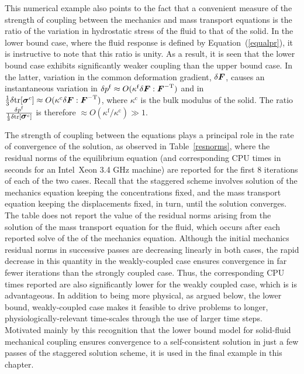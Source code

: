 This numerical example also points to the fact that a convenient
measure of the strength of coupling between the mechanics and mass
transport equations is the ratio of the variation in hydrostatic
stress of the fluid to that of the solid. In the lower bound case,
where the fluid response is defined by Equation~(\ref{equalpr}), it is
instructive to note that this ratio is unity. As a result, it is seen
that the lower bound case exhibits significantly weaker coupling than
the upper bound case. In the latter, variation in the common
deformation gradient, $\delta \mbox{\boldmath$ F$}$, causes an instantaneous variation
in \mbox{$\delta p^{\mathrm{f}} \approx O(\kappa^{\mathrm{f}} \delta
  \mbox{\boldmath$ F$}:\mbox{\boldmath$ F$}^{-\mathrm{T}})$} and in \mbox{$\frac{1}{3}
  \delta\mathrm{tr}[\mbox{\boldmath$\sigma$}^{c}] \approx O(\kappa^{\mathrm{c}}
  \delta \mbox{\boldmath$ F$}:\mbox{\boldmath$ F$}^{-\mathrm{T}})$}, where $\kappa^{\mathrm{c}}$ is the
bulk modulus of the solid. The ratio $\frac{\delta
  p^{\mathrm{f}}}{\frac{1}{3} \delta
  \mathrm{tr}[\mbox{\boldmath$\sigma$}^{c}]}$ is therefore \mbox{$\approx
  O(\kappa^{\mathrm{f}}/\kappa^{\mathrm{c}}) \gg 1$}.

The strength of coupling between the equations plays a principal role
in the rate of convergence of the solution, as observed in
Table~\ref{resnorms}, where the residual norms of the equilibrium
equation (and corresponding CPU times in seconds for an
\mbox{Intel\textregistered\ Xeon} 3.4 GHz machine) are reported for
the first 8 iterations of each of the two cases. Recall that the
staggered scheme involves solution of the mechanics equation keeping
the concentrations fixed, and the mass transport equation keeping the
displacements fixed, in turn, until the solution converges. The table
does not report the value of the residual norms arising from the
solution of the mass transport equation for the fluid, which occurs
after each reported solve of the of the mechanics equation. Although
the initial mechanics residual norms in successive passes are
decreasing linearly in both cases, the rapid decrease in this quantity
in the weakly-coupled case ensures convergence in far fewer iterations
than the strongly coupled case. Thus, the corresponding CPU times
reported are also significantly lower for the weakly coupled case,
which is is advantageous. In addition to being more physical, as
argued below, the lower bound, weakly-coupled case makes it feasible
to drive problems to longer, physiologically-relevant time-scales
through the use of larger time steps. Motivated mainly by this
recognition that the lower bound model for solid-fluid mechanical
coupling ensures convergence to a self-consistent solution in just a
few passes of the staggered solution scheme, it is used in the final
example in this chapter.

